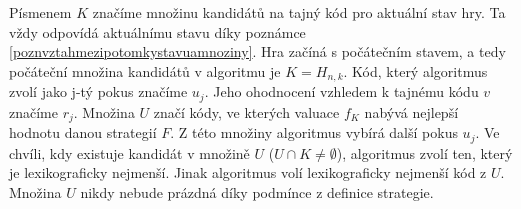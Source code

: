 Písmenem $K$ značíme množinu kandidátů na tajný kód pro aktuální stav hry. Ta vždy odpovídá aktuálnímu stavu díky poznámce \ref{poznvztahmezipotomkystavuamnoziny}. Hra začíná s počátečním stavem, a tedy počáteční množina kandidátů v algoritmu je $K = H_{n,k}$. Kód, který algoritmus zvolí jako j-tý pokus značíme $u_j$. Jeho ohodnocení vzhledem k tajnému kódu $v$ značíme $r_j$. Množina $U$ značí kódy, ve kterých valuace $f_K$ nabývá nejlepší hodnotu danou strategií $F$. Z této množiny algoritmus vybírá další pokus $u_j$. Ve chvíli, kdy existuje kandidát v množině $U$ ($U\cap K \neq \emptyset$), algoritmus zvolí ten, který je lexikograficky nejmenší. Jinak algoritmus volí lexikograficky nejmenší kód z $U$. Množina $U$ nikdy nebude prázdná díky podmínce z definice strategie. 



    


